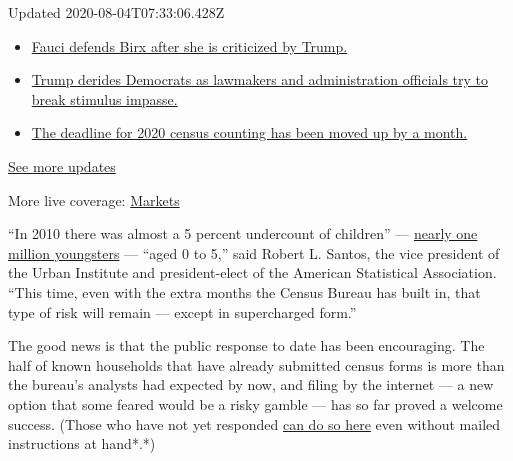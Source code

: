 Updated 2020-08-04T07:33:06.428Z

\begin{itemize}
\tightlist
\item
  \href{https://www.nytimes.com/2020/08/03/world/coronavirus-covid-19.html?action=click\&pgtype=Article\&state=default\&region=MAIN_CONTENT_1\&context=storylines_live_updates\#link-4547638f}{Fauci
  defends Birx after she is criticized by Trump.}
\item
  \href{https://www.nytimes.com/2020/08/03/world/coronavirus-covid-19.html?action=click\&pgtype=Article\&state=default\&region=MAIN_CONTENT_1\&context=storylines_live_updates\#link-15e7f995}{Trump
  derides Democrats as lawmakers and administration officials try to
  break stimulus impasse.}
\item
  \href{https://www.nytimes.com/2020/08/03/world/coronavirus-covid-19.html?action=click\&pgtype=Article\&state=default\&region=MAIN_CONTENT_1\&context=storylines_live_updates\#link-e5a2cda}{The
  deadline for 2020 census counting has been moved up by a month.}
\end{itemize}

\href{https://www.nytimes.com/2020/08/03/world/coronavirus-covid-19.html?action=click\&pgtype=Article\&state=default\&region=MAIN_CONTENT_1\&context=storylines_live_updates}{See
more updates}

More live coverage:
\href{https://www.nytimes.com/live/2020/08/03/business/stock-market-today-coronavirus?action=click\&pgtype=Article\&state=default\&region=MAIN_CONTENT_1\&context=storylines_live_updates}{Markets}

``In 2010 there was almost a 5 percent undercount of children'' ---
\href{https://www.census.gov/content/dam/Census/library/working-papers/2014/demo/2014-undercount-children.pdf}{nearly
one million youngsters} --- ``aged 0 to 5,'' said Robert L. Santos, the
vice president of the Urban Institute and president-elect of the
American Statistical Association. ``This time, even with the extra
months the Census Bureau has built in, that type of risk will remain ---
except in supercharged form.''

The good news is that the public response to date has been encouraging.
The half of known households that have already submitted census forms is
more than the bureau's analysts had expected by now, and filing by the
internet --- a new option that some feared would be a risky gamble ---
has so far proved a welcome success. (Those who have not yet responded
\href{https://2020census.gov}{can do so here} even without mailed
instructions at hand*.*)

